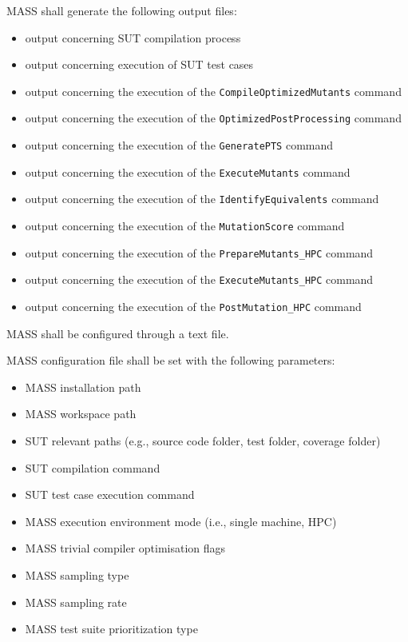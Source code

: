 \RQ{} MASS shall generate the following output files:
	\begin{itemize}
		\item output concerning SUT compilation process
		\item output concerning execution of SUT test cases
		\item output concerning the execution of the \texttt{CompileOptimizedMutants} command
		\item output concerning the execution of the \texttt{OptimizedPostProcessing} command
		\item output concerning the execution of the \texttt{GeneratePTS} command
		\item output concerning the execution of the \texttt{ExecuteMutants} command
		\item output concerning the execution of the \texttt{IdentifyEquivalents} command
		\item output concerning the execution of the \texttt{MutationScore} command
		\item output concerning the execution of the \texttt{PrepareMutants\_HPC} command
		\item output concerning the execution of the \texttt{ExecuteMutants\_HPC} command
		\item output concerning the execution of the \texttt{PostMutation\_HPC} command
	\end{itemize}

\RQ{} MASS shall be configured through a text file.

\RQ{} MASS configuration file shall be set with the following parameters:
	\begin{itemize}
		\item MASS installation path
		\item MASS workspace path
		\item SUT relevant paths (e.g., source code folder, test folder, coverage folder)
		\item SUT compilation command
		\item SUT test case execution command
		\item MASS execution environment mode (i.e., single machine, HPC)
		\item MASS trivial compiler optimisation flags
		\item MASS sampling type
		\item MASS sampling rate
		\item MASS test suite prioritization type
	\end{itemize}

